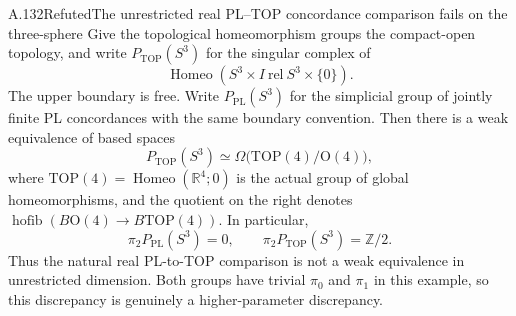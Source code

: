 \begin{saresult}{A.132}{Refuted}{The unrestricted real PL--TOP concordance comparison fails on the three-sphere}
Give the topological homeomorphism groups the compact-open topology,
and write $P_{\mathrm{TOP}}(S^3)$ for the singular complex of
\[
 \operatorname{Homeo}(S^3\times I\ \mathrm{rel}\ S^3\times\{0\}).
\]
The upper boundary is free. Write $P_{\mathrm{PL}}(S^3)$ for the
simplicial group of jointly finite PL concordances with the same
boundary convention. Then there is a weak equivalence of based spaces
\[
 P_{\mathrm{TOP}}(S^3)\simeq
 \Omega\bigl(\mathrm{TOP}(4)/\mathrm O(4)\bigr),
                                                        \tag{A.132.1}
\]
where $\mathrm{TOP}(4)=\operatorname{Homeo}(\mathbb R^4;0)$ is the
actual group of global homeomorphisms, and the quotient on the
right denotes $\operatorname{hofib}(B\mathrm O(4)\to
B\mathrm{TOP}(4))$. In particular,
\[
 \pi_2 P_{\mathrm{PL}}(S^3)=0,
 \qquad
 \pi_2 P_{\mathrm{TOP}}(S^3)=\mathbb Z/2.
                                                        \tag{A.132.2}
\]
Thus the natural real PL-to-TOP comparison is not a weak equivalence
in unrestricted dimension. Both groups have trivial $\pi_0$ and
$\pi_1$ in this example, so this discrepancy is genuinely a
higher-parameter discrepancy.
\end{saresult}
